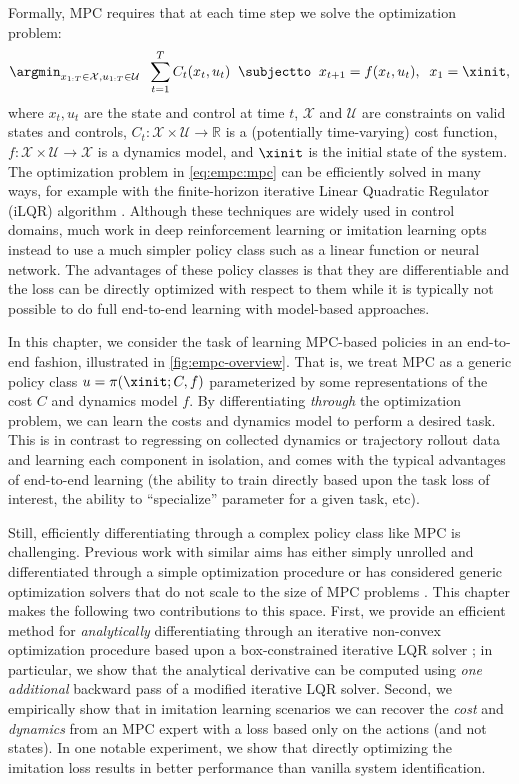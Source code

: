 Formally, MPC requires that at each time step we solve the optimization problem:
\begin{equation}
    \argmin_{x_{1:T} \in \mathcal{X},u_{1:T}\in \mathcal{U}} \;\; \sum_{t=1}^T  C_t(x_t, u_t)
    \;\; \subjectto \;\; x_{t+1} = f(x_t, u_t), \;\; x_1 = \xinit,
  \label{eq:empc:mpc}
\end{equation}
where $x_t, u_t$ are the state and control at time $t$, $\mathcal{X}$ and
$\mathcal{U}$ are constraints on valid states and controls, $C_t : \mathcal{X}
\times \mathcal{U} \rightarrow \mathbb{R}$ is a (potentially time-varying) cost
function, $f : \mathcal{X}
\times \mathcal{U} \rightarrow \mathcal{X}$ is a dynamics model, and
$\xinit$ is the initial state of the system.
The optimization problem in \cref{eq:empc:mpc} can be efficiently solved
in many ways, for example with the finite-horizon iterative Linear
Quadratic Regulator (iLQR) algorithm \citep{li2004ilqr}.
Although these techniques are widely used in control domains, much work in
deep reinforcement learning or imitation learning opts instead to use a much
simpler policy class such as a linear function or neural network.
The advantages of these policy classes is that they are
differentiable and the loss can be directly optimized with respect to them
while it is typically not possible to do full end-to-end
learning with model-based approaches.

In this chapter, we consider the task of learning MPC-based policies in an
end-to-end fashion, illustrated in \cref{fig:empc-overview}.
That is, we treat MPC as a generic policy
class $u = \pi(\xinit; C, f)$ parameterized by some representations of
the cost $C$ and dynamics model $f$.
By differentiating \emph{through} the optimization
problem, we can learn the costs and dynamics model to perform
a desired task. This is in contrast to regressing on collected dynamics or
trajectory rollout data and learning each component in isolation, and comes with
the typical advantages of end-to-end learning (the ability to train directly
based upon the task loss of interest, the ability to ``specialize'' parameter
for a given task, etc).

Still, efficiently differentiating through a complex
policy class like MPC is challenging.
Previous work with similar aims has either simply unrolled and differentiated
through a simple optimization procedure \citep{tamar2017learning} or
has considered generic optimization solvers that do not scale to the
size of MPC problems \citep{amos2017optnet}.
This chapter makes the following two contributions to this space.
First, we provide an efficient method for \emph{analytically} differentiating
through an iterative non-convex optimization procedure based upon a
box-constrained iterative LQR solver \citep{tassa2014control}; in particular,
we show that the analytical derivative can be computed using
\emph{one additional} backward pass of a modified iterative LQR solver.
Second, we empirically show that in imitation learning scenarios
we can recover the \emph{cost} and \emph{dynamics} from an MPC
expert with a loss based only on the actions (and not states).
In one notable experiment, we show that directly optimizing the
imitation loss results in better performance than vanilla
system identification.

